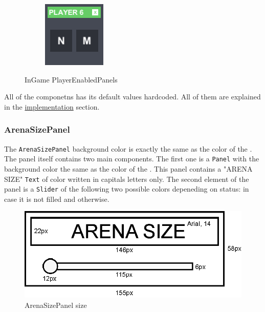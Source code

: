 \begin{figure}[h!]
\begin{subfigure}{0.195\textwidth}
	\end{subfigure}
	\begin{subfigure}{0.195\textwidth}
		\centering
		\includegraphics[scale=1, frame]{gui-imgs/player6enabledpanel}
	\end{subfigure}
	\caption{InGame PlayerEnabledPanels}
\end{figure}

\noindent All of the componetns has its default values hardcoded. All of them are explained in the \hyperref[gui-implementation]{implementation} section.

\subsubsection{ArenaSizePanel}\label{gui-arenasizepanel}
\noindent The \verb+ArenaSizePanel+ background color is exactly the same as the color of the . The panel itself contains two main components. The first one is a \verb+Panel+ with the background color the same as the color of the . This panel contains a "ARENA SIZE" \verb+Text+ of  color written in capitals letters only. The second element of the panel is a \verb+Slider+ of the following two possible colors depeneding on status:  in case it is not filled and  otherwise.
\newpage

\begin{figure}[h!]
	\centering
	\includegraphics[scale=1]{gui-imgs/arenasizepanel-size}
	\caption{ArenaSizePanel size}
\end{figure}

